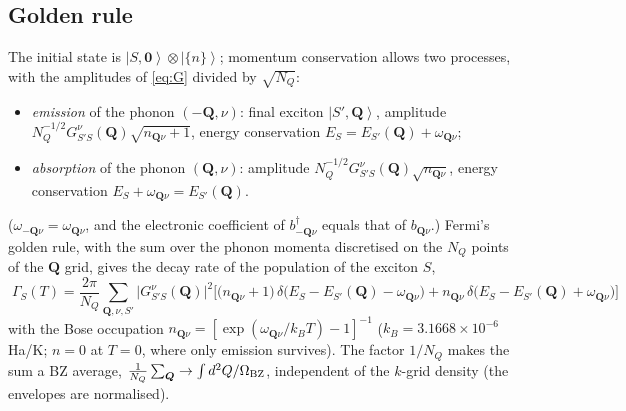 \documentclass[11pt,a4paper]{article}
\newcommand{\QQ}{\bm{Q}}
\newcommand{\ket}[1]{\left|#1\right\rangle}
\newcommand{\NQ}{N_{Q}}
\begin{document}
\subsection{Golden rule}
The initial state is $\ket{S,\bm0}\otimes\ket{\{n\}}$; momentum conservation allows two processes, with the amplitudes of \eqref{eq:G} divided by $\sqrt{\NQ}$:
\begin{itemize}[leftmargin=*,itemsep=0pt]
\item \emph{emission} of the phonon $(-\QQ,\nu)$: final exciton $\ket{S',\QQ}$, amplitude $\NQ^{-1/2}G^\nu_{S'S}(\QQ)\sqrt{n_{\QQ\nu}+1}$, energy conservation $E_S=E_{S'}(\QQ)+\omega_{\QQ\nu}$;
\item \emph{absorption} of the phonon $(\QQ,\nu)$: amplitude $\NQ^{-1/2}G^\nu_{S'S}(\QQ)\sqrt{n_{\QQ\nu}}$, energy conservation $E_S+\omega_{\QQ\nu}=E_{S'}(\QQ)$.
\end{itemize}
($\omega_{-\QQ\nu}=\omega_{\QQ\nu}$, and the electronic coefficient of $b^\dagger_{-\QQ\nu}$ equals that of $b_{\QQ\nu}$.) Fermi's golden rule, with the sum over the phonon momenta discretised on the $\NQ$ points of the $\QQ$ grid, gives the decay rate of the population of the exciton $S$,
\begin{equation}
\boxed{\;
\Gamma_S(T)=\frac{2\pi}{\NQ}\sum_{\QQ,\nu,S'}\big|G^\nu_{S'S}(\QQ)\big|^2\Big[\big(n_{\QQ\nu}+1\big)\,\delta\big(E_S-E_{S'}(\QQ)-\omega_{\QQ\nu}\big)+n_{\QQ\nu}\,\delta\big(E_S-E_{S'}(\QQ)+\omega_{\QQ\nu}\big)\Big]\;}
\label{eq:Gamma}
\end{equation}
with the Bose occupation $n_{\QQ\nu}=[\exp(\omega_{\QQ\nu}/k_BT)-1]^{-1}$ ($k_B=3.1668\times10^{-6}$ Ha/K; $n=0$ at $T=0$, where only emission survives). The factor $1/\NQ$ makes the sum a BZ average, $\frac{1}{\NQ}\sum_{\QQ}\to\int d^2Q/\Omega_{\rm BZ}$, independent of the $k$-grid density (the envelopes are normalised).
\end{document}
